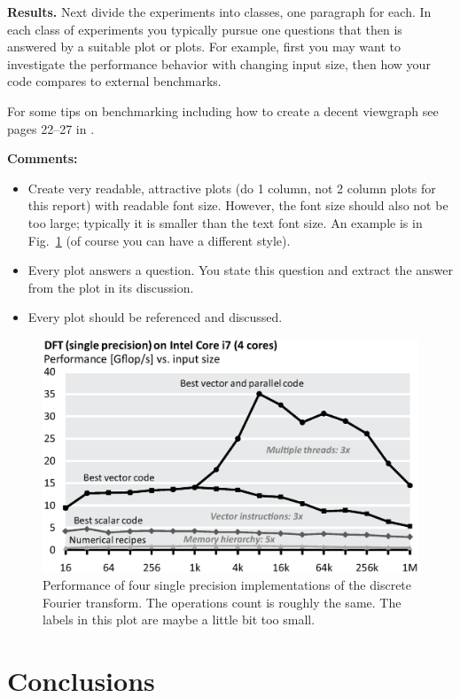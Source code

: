 \documentclass[letterpaper]{article}
\newcommand{\mypar}[1]{{\bf #1.}}
\begin{document}
\mypar{Results}
Next divide the experiments into classes, one paragraph for each. In each class of experiments you typically pursue one questions that then is answered by a suitable plot or plots. For example, first you may want to investigate the performance behavior with changing input size, then how your code compares to external benchmarks.

For some tips on benchmarking including how to create a decent viewgraph see pages 22--27 in \cite{Pueschel:10}.

{\bf Comments:}
\begin{itemize}
\item Create very readable, attractive plots (do 1 column, not 2 column plots
for this report) with readable font size. However, the font size should also not be too large; typically it is smaller than the text font size.
An example is in Fig.~\ref{fftperf} (of course you can have a different style).
\item Every plot answers a question. You state this question and extract the
answer from the plot in its discussion.
\item Every plot should be referenced and discussed.
\end{itemize}

\begin{figure}\centering
  \includegraphics[scale=0.33]{dft-performance.eps}
  \caption{Performance of four single precision implementations of the
  discrete Fourier transform. The operations count is roughly the
  same. The labels in this plot are maybe a little bit too small.\label{fftperf}}
\end{figure}

\section{Conclusions}
\end{document}
